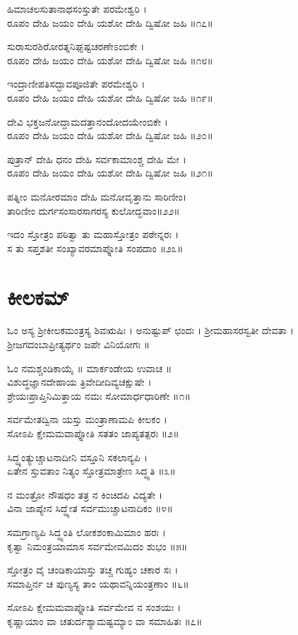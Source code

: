 ಹಿಮಾಚಲಸುತಾನಾಥಸಂಸ್ತುತೇ ಪರಮೇಶ್ವರಿ ।\\
ರೂಪಂ ದೇಹಿ ಜಯಂ ದೇಹಿ ಯಶೋ ದೇಹಿ ದ್ವಿಷೋ ಜಹಿ ॥೧೭॥

ಸುರಾಸುರಶಿರೋರತ್ನನಿಘೃಷ್ಟಚರಣೇಽಂಬಿಕೇ ।\\
ರೂಪಂ ದೇಹಿ ಜಯಂ ದೇಹಿ ಯಶೋ ದೇಹಿ ದ್ವಿಷೋ ಜಹಿ ॥೧೮॥

ಇಂದ್ರಾಣೀಪತಿಸದ್ಭಾವಪೂಜಿತೇ ಪರಮೇಶ್ವರಿ ।\\
ರೂಪಂ ದೇಹಿ ಜಯಂ ದೇಹಿ ಯಶೋ ದೇಹಿ ದ್ವಿಷೋ ಜಹಿ ॥೧೯॥

ದೇವಿ ಭಕ್ತಜನೋದ್ದಾಮದತ್ತಾನಂದೋದಯೇಂಬಿಕೇ ।\\
ರೂಪಂ ದೇಹಿ ಜಯಂ ದೇಹಿ ಯಶೋ ದೇಹಿ ದ್ವಿಷೋ ಜಹಿ ॥೨೦॥

ಪುತ್ರಾನ್ ದೇಹಿ ಧನಂ ದೇಹಿ ಸರ್ವಕಾಮಾಂಶ್ಚ ದೇಹಿ ಮೇ ।\\
ರೂಪಂ ದೇಹಿ ಜಯಂ ದೇಹಿ ಯಶೋ ದೇಹಿ ದ್ವಿಷೋ ಜಹಿ ॥೨೧॥

ಪತ್ನೀಂ ಮನೋರಮಾಂ ದೇಹಿ ಮನೋವೃತ್ತಾನು ಸಾರಿಣೀಂ।\\
ತಾರಿಣೀಂ ದುರ್ಗಸಂಸಾರಸಾಗರಸ್ಯ ಕುಲೋದ್ಭವಾಂ॥೨೨॥

ಇದಂ ಸ್ತೋತ್ರಂ ಪಠಿತ್ವಾ ತು ಮಹಾಸ್ತೋತ್ರಂ ಪಠೇನ್ನರಃ ।\\
ಸ ತು ಸಪ್ತಶತೀ ಸಂಖ್ಯಾವರಮಾಪ್ನೋತಿ ಸಂಪದಾಂ ॥೨೩॥
\section{ಕೀಲಕಮ್}
ಓಂ ಅಸ್ಯ ಶ್ರೀಕೀಲಕಮಂತ್ರಸ್ಯ ಶಿವಋಷಿಃ । ಅನುಷ್ಟುಪ್ ಛಂದಃ । ಶ್ರೀಮಹಾಸರಸ್ವತೀ ದೇವತಾ । ಶ್ರೀಜಗದಂಬಾಪ್ರೀತ್ಯರ್ಥಂ ಜಪೇ ವಿನಿಯೋಗಃ ॥

ಓಂ ನಮಶ್ಚಂಡಿಕಾಯೈ ॥ ಮಾರ್ಕಂಡೇಯ ಉವಾಚ ॥\\
ವಿಶುದ್ಧಜ್ಞಾನದೇಹಾಯ ತ್ರಿವೇದೀದಿವ್ಯಚಕ್ಷುಷೇ ।\\
ಶ್ರೇಯಃಪ್ರಾಪ್ತಿನಿಮಿತ್ತಾಯ ನಮಃ ಸೋಮಾರ್ಧಧಾರಿಣೇ ॥೧॥

ಸರ್ವಮೇತದ್ವಿನಾ ಯಸ್ತು ಮಂತ್ರಾಣಾಮಪಿ ಕೀಲಕಂ ।\\
ಸೋಽಪಿ ಕ್ಷೇಮಮವಾಪ್ನೋತಿ ಸತತಂ ಜಾಪ್ಯತತ್ಪರಃ ॥೨॥

ಸಿದ್ಧ್ಯಂತ್ಯುಚ್ಚಾಟನಾದೀನಿ ವಸ್ತೂನಿ ಸಕಲಾನ್ಯಪಿ ।\\
ಏತೇನ ಸ್ತುವತಾಂ ನಿತ್ಯಂ ಸ್ತೋತ್ರಮಾತ್ರೇಣ ಸಿದ್ಧ್ಯತಿ ॥೩॥

ನ ಮಂತ್ರೋ ನೌಷಧಂ ತತ್ರ ನ ಕಿಂಚಿದಪಿ ವಿದ್ಯತೇ ।\\
ವಿನಾ ಜಾಪ್ಯೇನ ಸಿದ್ಧ್ಯೇತ ಸರ್ವಮುಚ್ಚಾಟನಾದಿಕಂ ॥೪॥

ಸಮಗ್ರಾಣ್ಯಪಿ ಸಿದ್ಧ್ಯಂತಿ ಲೋಕಶಂಕಾಮಿಮಾಂ ಹರಃ ।\\
ಕೃತ್ವಾ ನಿಮಂತ್ರಯಾಮಾಸ ಸರ್ವಮೇವಮಿದಂ ಶುಭಂ ॥೫॥

ಸ್ತೋತ್ರಂ ವೈ ಚಂಡಿಕಾಯಾಸ್ತು ತಚ್ಚ ಗುಹ್ಯಂ ಚಕಾರ ಸಃ ।\\
ಸಮಾಪ್ತಿರ್ನ ಚ ಪುಣ್ಯಸ್ಯ ತಾಂ ಯಥಾವನ್ನಿಯಂತ್ರಣಾಂ ॥೬॥

ಸೋಽಪಿ ಕ್ಷೇಮಮವಾಪ್ನೋತಿ ಸರ್ವಮೇವ ನ ಸಂಶಯಃ ।\\
ಕೃಷ್ಣಾಯಾಂ ವಾ ಚತುರ್ದಶ್ಯಾಮಷ್ಟಮ್ಯಾಂ ವಾ ಸಮಾಹಿತಃ ॥೭॥

